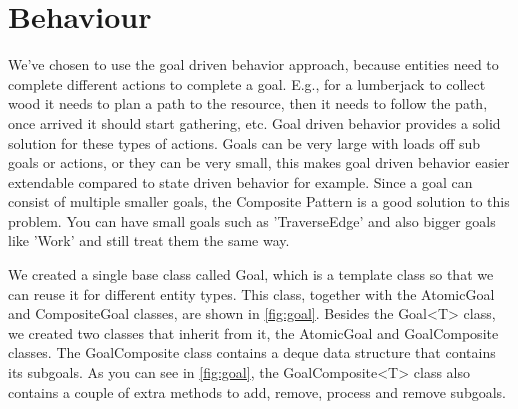 \section{Behaviour}
\label{sec:behaviour}
We've chosen to use the goal driven behavior approach, because entities need to complete different actions to complete a goal. E.g., for a lumberjack to collect wood it needs to plan a path to the resource, then it needs to follow the path, once arrived it should start gathering, etc. Goal driven behavior provides a solid solution for these types of actions. Goals can be very large with loads off sub goals or actions, or they can be very small, this makes goal driven behavior easier extendable compared to state driven behavior for example. Since a goal can consist of multiple smaller goals, the Composite Pattern is a good solution to this problem. You can have small goals such as 'TraverseEdge' and also bigger goals like 'Work' and still treat them the same way. \cite{composite-pattern}

We created a single base class called Goal, which is a template class so that we can reuse it for different entity types. This class, together with the AtomicGoal and CompositeGoal classes, are shown in \cref{fig:goal}. Besides the Goal<T> class, we created two classes that inherit from it, the AtomicGoal and GoalComposite classes. The GoalComposite class contains a deque data structure that contains its subgoals. As you can see in \cref{fig:goal}, the GoalComposite<T> class also contains a couple of extra methods to add, remove, process and remove subgoals.




\newpage

